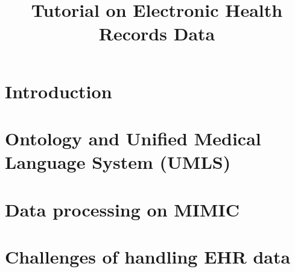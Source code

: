 \documentclass{article}
\title{Tutorial on Electronic Health Records Data}
\author{%
}
\begin{document}
\maketitle

\section{Introduction}

\newpage


\section{Ontology and Unified Medical Language System (UMLS)}

\newpage
 


\section{Data processing on MIMIC}

\newpage



\section{Challenges of handling EHR data}

\newpage







\end{document}
